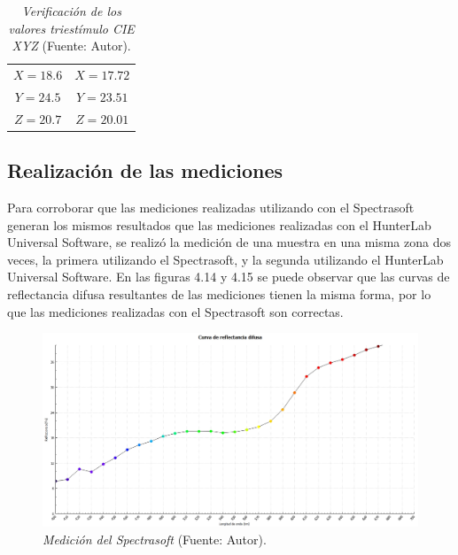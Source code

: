 	\begin{table}[h]
		\small
		\caption[Verificaci\'{o}n de los valores triest\'{i}mulo CIE XYZ]{\textit{Verificaci\'{o}n de los valores triest\'{i}mulo CIE XYZ} (Fuente: Autor).}
		\centering
		\setlength{\extrarowheight}{\altocelda}
		\begin{tabulary}{\anchotabla}{|c|c|}
			\hline
			 & \\ \hline
			$X = 18.6$ & $X = 17.72$\\ \hline
			$Y = 24.5$ & $Y = 23.51$\\ \hline
			$Z = 20.7$ & $Z = 20.01$\\ \hline
		\end{tabulary}
	\end{table}
	
	\subsection{Realizaci\'{o}n de las mediciones}
		Para corroborar que las mediciones realizadas utilizando con el Spectrasoft generan los mismos resultados que las mediciones realizadas con el HunterLab Universal Software, se realiz\'{o} la medici\'{o}n de una muestra en una misma zona dos veces, la primera utilizando el Spectrasoft, y la segunda utilizando el HunterLab Universal Software. En las figuras 4.14 y 4.15 se puede observar que las curvas de reflectancia difusa resultantes de las mediciones tienen la misma forma, por lo que las mediciones realizadas con el Spectrasoft son correctas.
	\newpage
 	\begin{figure}[H]
		\centering
		\includegraphics[scale=0.4]{img/medicion-spectrasoft.jpg}
			\caption[Medici\'{o}n del Spectrasoft]{\textit{Medici\'{o}n del Spectrasoft} (Fuente: Autor).}
	\end{figure}
	
